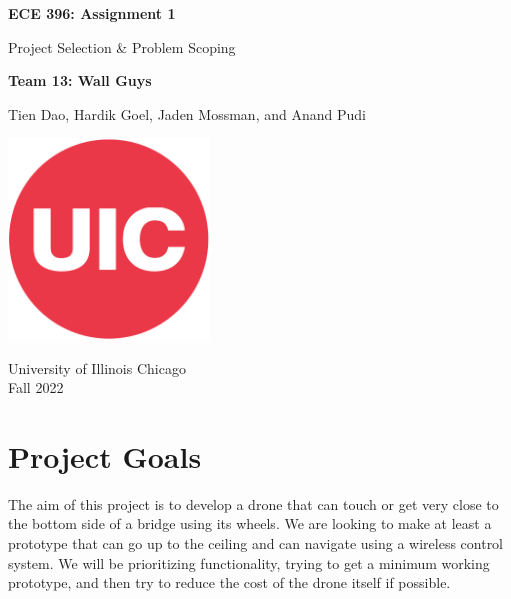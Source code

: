 \documentclass[12pt]{article}
\begin{document}
    \begin{titlepage}
        \begin{center}
            \vspace*{1cm}
            \Huge\textbf{ECE 396: Assignment 1}

                \vspace{0.5cm}
                \LARGE Project Selection \& Problem Scoping
    
            \vspace{1.5cm}
            \textbf{Team 13: Wall Guys}

                \vspace{0.5cm}
                Tien Dao, Hardik Goel, Jaden Mossman, and Anand Pudi

            \vfill             
            \includegraphics[width=0.4\textwidth]{resources/uic_logo.png}

            \vspace{0.8cm}
            University of Illinois Chicago\\
            Fall 2022
                
        \end{center}
    \end{titlepage}

    \tableofcontents

    \newpage

    \section{Project Goals}
        The aim of this project is to develop a drone that can touch or get very close to the bottom side of a bridge using its wheels. We are looking to make at least a prototype that can go up to the ceiling and can navigate using a wireless control system. We will be prioritizing functionality, trying to get a minimum working prototype, and then try to reduce the cost of the drone itself if possible.
\end{document}

